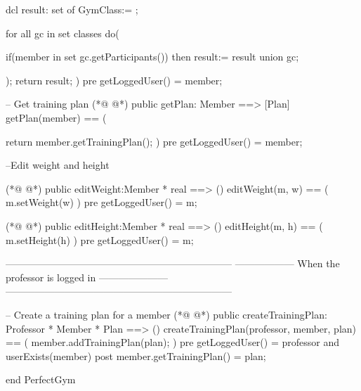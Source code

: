 \begin{vdmpp}[breaklines=true]
  dcl result: set of GymClass:= {};
  
  for all gc in set classes do(
   
   if(member in set gc.getParticipants()) then result:= result union {gc};
    
  );
  return result;
 )
 pre getLoggedUser() = member;
 
 -- Get training plan  
(*@
\label{getPlan:304}
@*)
 public getPlan: Member ==> [Plan]
 getPlan(member) == (
  
  return member.getTrainingPlan();
 )
 pre getLoggedUser() = member;
 
 
 --Edit weight and height
 
(*@
\label{editWeight:314}
@*)
 public editWeight:Member * real ==> ()
 editWeight(m, w) ==  (
  m.setWeight(w)
 ) 
 pre getLoggedUser() = m;
  
(*@
\label{editHeight:320}
@*)
  public editHeight:Member * real ==> ()
 editHeight(m, h) ==  (
  m.setHeight(h)
 ) 
 pre getLoggedUser() = m;
 
 
 
  ---------------------------------------------------------------------
  ------------------ When the professor is logged in ---------------------
  ---------------------------------------------------------------------

 -- Create a training plan for a member
(*@
\label{createTrainingPlan:333}
@*)
 public createTrainingPlan: Professor * Member * Plan ==> ()
 createTrainingPlan(professor, member, plan) == (
   member.addTrainingPlan(plan);
 )
 pre getLoggedUser() = professor and userExists(member)
 post member.getTrainingPlan() = plan;
 
end PerfectGym
\end{vdmpp}
\bigskip
